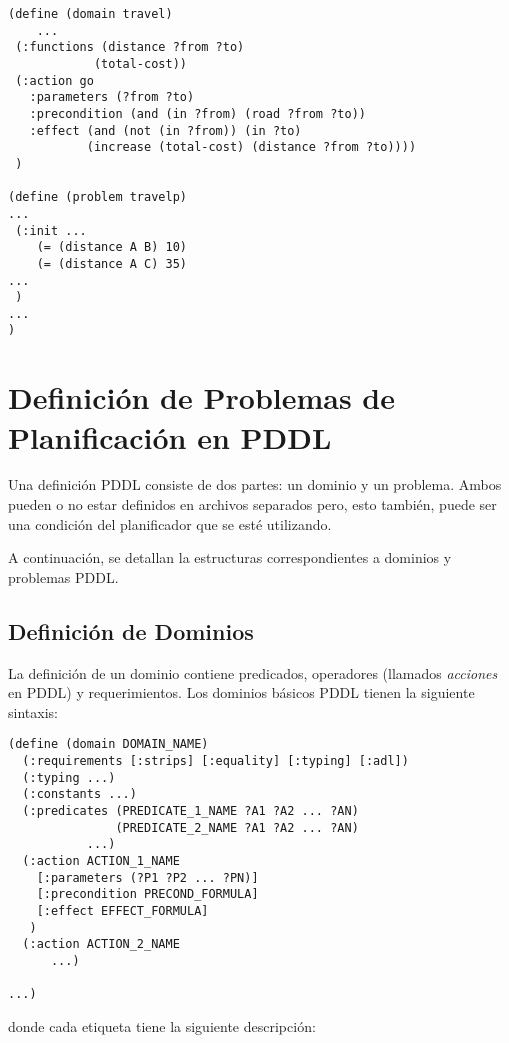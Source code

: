 \begin{itemize}
\begin{ejemplo}
	\begin{verbatim}
(define (domain travel)
	...
 (:functions (distance ?from ?to)
            (total-cost))
 (:action go
   :parameters (?from ?to)
   :precondition (and (in ?from) (road ?from ?to))
   :effect (and (not (in ?from)) (in ?to)
           (increase (total-cost) (distance ?from ?to))))
 )
 
(define (problem travelp)
...
 (:init ...
    (= (distance A B) 10)
    (= (distance A C) 35)
...
 )
...
)
	\end{verbatim}
	\end{ejemplo}
	\end{itemize}
 


\section{Definici\'on de Problemas de Planificaci\'on en PDDL} \label{cap1:Definicion de Problemas de planificaci\'on en PDDL}

Una definici\'on PDDL consiste de dos partes: un dominio y un problema.
Ambos pueden o no estar definidos en archivos separados pero, esto
tambi\'en, puede ser una condici\'on del planificador que se est\'e utilizando.

A continuaci\'on, se detallan la estructuras correspondientes
a dominios y problemas PDDL.

\subsection{Definici\'on de Dominios}

La definici\'on de un dominio contiene predicados, operadores 
(llamados \emph{acciones} en PDDL) y requerimientos. Los dominios 
b\'asicos PDDL tienen la siguiente sintaxis:

 \begin{verbatim}
(define (domain DOMAIN_NAME)
  (:requirements [:strips] [:equality] [:typing] [:adl])
  (:typing ...)
  (:constants ...)
  (:predicates (PREDICATE_1_NAME ?A1 ?A2 ... ?AN)
               (PREDICATE_2_NAME ?A1 ?A2 ... ?AN)
	       ...)
  (:action ACTION_1_NAME
    [:parameters (?P1 ?P2 ... ?PN)]
    [:precondition PRECOND_FORMULA]
    [:effect EFFECT_FORMULA]
   )
  (:action ACTION_2_NAME
      ...)

...)
 \end{verbatim}
donde cada etiqueta tiene la siguiente descripci\'on:

